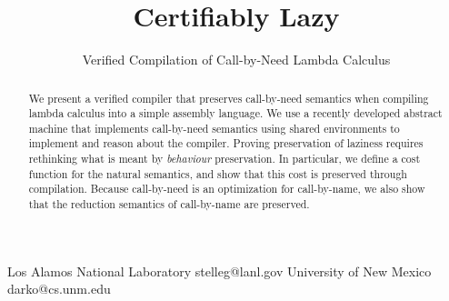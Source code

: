 \documentclass[preprint]{sigplanconf}
\begin{document}
\copyrightdata{[to be supplied]} 


\title{Certifiably Lazy}
\subtitle{Verified Compilation of Call-by-Need Lambda Calculus}

           {Los Alamos National Laboratory}
           {stelleg@lanl.gov}
           {University of New Mexico}
           {darko@cs.unm.edu}

\maketitle

\begin{abstract}
We present a verified compiler that preserves call-by-need semantics when
compiling lambda calculus into a simple assembly language. We use a recently
developed abstract machine that implements call-by-need semantics using shared
environments to implement and reason about the compiler. Proving preservation
of laziness requires rethinking what is meant by \emph{behaviour} preservation.
In particular, we define a cost function for the natural semantics, and show
that this cost is preserved through compilation.  Because call-by-need is an
optimization for call-by-name, we also show that the reduction semantics of
call-by-name are preserved.
\end{abstract}












\end{document}
